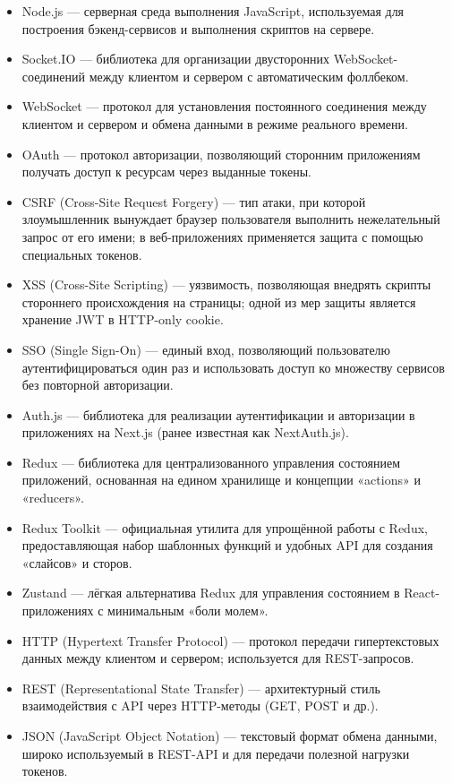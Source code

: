 \begin{itemize}
  \item Node.js — серверная среда выполнения JavaScript, используемая для построения бэкенд-сервисов и выполнения скриптов на сервере.
  \item Socket.IO — библиотека для организации двусторонних WebSocket-соединений между клиентом и сервером с автоматическим фоллбеком.
  \item WebSocket — протокол для установления постоянного соединения между клиентом и сервером и обмена данными в режиме реального времени.
  \item OAuth — протокол авторизации, позволяющий сторонним приложениям получать доступ к ресурсам через выданные токены.
  \item CSRF (Cross-Site Request Forgery) — тип атаки, при которой злоумышленник вынуждает браузер пользователя выполнить нежелательный запрос от его имени; в веб-приложениях применяется защита с помощью специальных токенов.
  \item XSS (Cross-Site Scripting) — уязвимость, позволяющая внедрять скрипты стороннего происхождения на страницы; одной из мер защиты является хранение JWT в HTTP-only cookie.
  \item SSO (Single Sign-On) — единый вход, позволяющий пользователю аутентифицироваться один раз и использовать доступ ко множеству сервисов без повторной авторизации.
  \item Auth.js — библиотека для реализации аутентификации и авторизации в приложениях на Next.js (ранее известная как NextAuth.js).
  \item Redux — библиотека для централизованного управления состоянием приложений, основанная на едином хранилище и концепции «actions» и «reducers».
  \item Redux Toolkit — официальная утилита для упрощённой работы с Redux, предоставляющая набор шаблонных функций и удобных API для создания «слайсов» и сторов.
  \item Zustand — лёгкая альтернатива Redux для управления состоянием в React-приложениях с минимальным «боли молем».
  \item HTTP (Hypertext Transfer Protocol) — протокол передачи гипертекстовых данных между клиентом и сервером; используется для REST-запросов.
  \item REST (Representational State Transfer) — архитектурный стиль взаимодействия с API через HTTP-методы (GET, POST и др.).
  \item JSON (JavaScript Object Notation) — текстовый формат обмена данными, широко используемый в REST-API и для передачи полезной нагрузки токенов.

\end{itemize}
